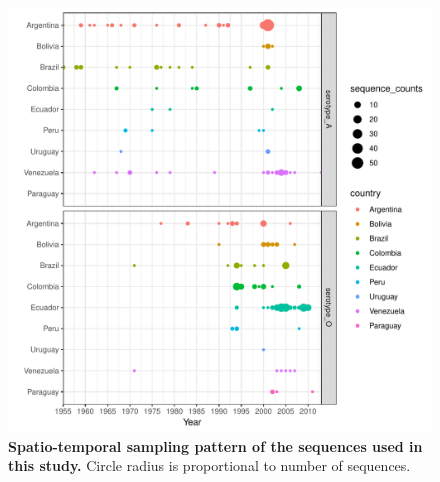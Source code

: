 \documentclass[a4paper,10pt]{article}
\begin{document}
\newpage
\begin{center}
\begin{figure}[H]
\begin{center}
\includegraphics[scale=.80]{FIGURES/PLOTS/sampling_bubble_plot.pdf}
\end{center}
\caption{
\textbf{Spatio-temporal sampling pattern of the sequences used in this study.} Circle radius is proportional to number of sequences.
}
\label{sfig:sampling}
\end{figure}
\end{center}
\newpage
\end{document}
